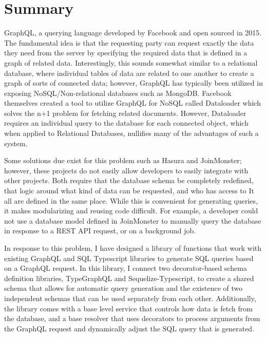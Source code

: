 \section{Summary}

GraphQL, a querying language developed by Facebook and open sourced in 2015.  The fundamental idea is that the requesting party can request exactly the data they need from the server by specifying the required data that is defined in a graph of related data.  Interestingly, this sounds somewhat similar to a relational database, where individual tables of data are related to one another to create a graph of sorts of connected data; however, GraphQL has typically been utilized in exposing NoSQL/Non-relational databases such as MongoDB.  Facebook themselves created a tool to utilize GraphQL for NoSQL called Dataloader which solves the n+1 problem for fetching related documents.  However, Dataloader requires an individual query to the database for each connected object, which when applied to Relational Databases, nullifies many of the advantages of such a system.

Some solutions due exist for this problem such as Hasura and JoinMonster; however, these projects do not easily allow developers to easily integrate with other projects.  Both require that the database schema be completely redefined, that logic around what kind of data can be requested, and who has access to It all are defined in the same place.  While this is convenient for generating queries, it makes modularizing and reusing code difficult.  For example, a developer could not use a database model defined in JoinMonster to manually query the database in response to a REST API request, or on a background job.

In response to this problem, I have designed a library of functions that work with existing GraphQL and SQL Typescript libraries to generate SQL queries based on a GraphQL request.  In this library, I connect two decorator-based schema definition libraries, TypeGraphQL and Sequelize-Typescript, to create a shared schema that allows for automatic query generation and the existence of two independent schemas that can be used separately from each other.  Additionally, the library comes with a base level service that controls how data is fetch from the database, and a base resolver that uses decorators to process arguments from the GraphQL request and dynamically adjust the SQL query that is generated.
	
